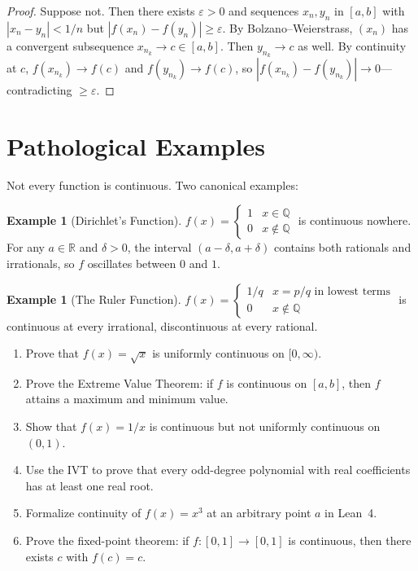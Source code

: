 \documentclass[12pt, openany]{book}
\theoremstyle{plain}
\theoremstyle{definition}
\newtheorem{example}[theorem]{Example}
\theoremstyle{remark}
\newcommand{\Q}{\mathbb{Q}}
\newcommand{\R}{\mathbb{R}}
\newcommand{\eps}{\varepsilon}
\newcommand{\del}{\delta}
\begin{document}
\begin{proof}
Suppose not. Then there exists $\eps > 0$ and sequences $x_n, y_n$ in $[a,b]$ with $|x_n - y_n| < 1/n$ but $|f(x_n) - f(y_n)| \geq \eps$. By Bolzano--Weierstrass, $(x_n)$ has a convergent subsequence $x_{n_k} \to c \in [a,b]$. Then $y_{n_k} \to c$ as well. By continuity at $c$, $f(x_{n_k}) \to f(c)$ and $f(y_{n_k}) \to f(c)$, so $|f(x_{n_k}) - f(y_{n_k})| \to 0$---contradicting $\geq \eps$.
\end{proof}

\section{Pathological Examples}

Not every function is continuous. Two canonical examples:

\begin{example}[Dirichlet's Function]
$f(x) = \begin{cases} 1 & x \in \Q \\ 0 & x \notin \Q \end{cases}$ is continuous nowhere. For any $a \in \R$ and $\del > 0$, the interval $(a-\del, a+\del)$ contains both rationals and irrationals, so $f$ oscillates between $0$ and $1$.
\end{example}

\begin{example}[The Ruler Function]
$f(x) = \begin{cases} 1/q & x = p/q \text{ in lowest terms} \\ 0 & x \notin \Q \end{cases}$ is continuous at every irrational, discontinuous at every rational.
\end{example}

\begin{exbox}
\begin{enumerate}
  \item Prove that $f(x) = \sqrt{x}$ is uniformly continuous on $[0, \infty)$.
  \item Prove the Extreme Value Theorem: if $f$ is continuous on $[a,b]$, then $f$ attains a maximum and minimum value.
  \item Show that $f(x) = 1/x$ is continuous but not uniformly continuous on $(0, 1)$.
  \item Use the IVT to prove that every odd-degree polynomial with real coefficients has at least one real root.
  \item Formalize continuity of $f(x) = x^3$ at an arbitrary point $a$ in Lean~4.
  \item Prove the fixed-point theorem: if $f : [0,1] \to [0,1]$ is continuous, then there exists $c$ with $f(c) = c$.
\end{enumerate}
\end{exbox}
\color{black}
\end{document}
